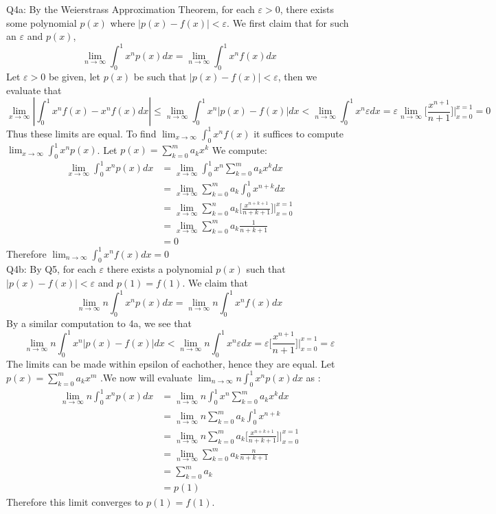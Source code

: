 \documentclass[letterpaper]{article}
\begin{document}
\noindent Q4a: By the Weierstrass Approximation Theorem, for each $\varepsilon>0$, there exists some polynomial $p(x)$ where $|p(x)-f(x)|<\varepsilon$. We first claim that for such an $\varepsilon$ and $p(x)$, $$\lim_{n\to \infty} \int_{0}^1 x^n p(x) dx = \lim_{n \to \infty}\int_0^1 x^n f(x) dx$$
Let $\varepsilon>0$ be given, let $p(x)$ be such that $|p(x)-f(x)|<\varepsilon$, then we evaluate that
$$\lim_{x \to \infty}|\int_{0}^1 x^nf(x) -x^nf(x) dx| \leq \lim_{n\to \infty} \int_0^1 x^n|p(x)-f(x)|dx < \lim_{n\to \infty} \int_0^1 x^n \varepsilon dx = \varepsilon \lim_{n\to \infty}\Big[\frac{x^{n+1}}{n+1}\Big] \Big|_{x=0}^{x=1} =0$$
Thus these limits are equal. To find $\lim_{x \to \infty}\int_{0}^1 x^nf(x)$ it suffices to compute $\lim_{x \to \infty}\int_{0}^1 x^np(x)$. Let $p(x) = \sum_{k=0}^m a_k x^k$
We compute:
\begin{align*}
    \lim_{x \to \infty}\int_{0}^1 x^n p(x) dx & = \lim_{x \to \infty}\int_{0}^1 x^n \sum_{k=0}^m a_k x^k dx
    \\ & = \lim_{x \to \infty}\sum_{k=0}^m a_k \int_{0}^1 x^{n+k} dx
    \\ & = \lim_{x \to \infty} \sum_{k=0}^n a_k \Big[\frac{x^{n+k+1}}{n+k+1} \Big] \Big|_{x=0}^{x=1}
    \\ & = \lim_{x \to \infty} \sum_{k=0}^m a_k \frac{1}{n+k+1}
    \\ & = 0
\end{align*} Therefore $\lim_{n\to \infty } \int_{0}^1 x^n f(x)dx = 0$
\newline \\ Q4b: By Q5, for each $\varepsilon$ there exists a polynomial $p(x)$ such that $|p(x)-f(x)|< \varepsilon$ and $p(1)=f(1)$. We claim that $$\lim_{n \to \infty} n \int_{0}^1 x^n p(x) dx = \lim_{n \to \infty} n \int_{0}^1 x^n f(x) dx $$
By a similar computation to 4a, we see that 
$$\lim_{n \to \infty } n \int_{0}^1 x^n|p(x)-f(x)| dx < \lim_{n \to \infty } n \int_{0}^1 x^n \varepsilon  dx = \varepsilon \Big[\frac{x^{n+1}}{n+1} \Big] \Big|_{x=0}^{x=1} = \varepsilon$$
The limits can be made within epsilon of eachother, hence they are equal. Let $p(x) = \sum_{k=0}^m a_k x^m$ .We now will evaluate $\lim_{n \to \infty } n \int_{0}^1 x^n p(x) dx$ as : 
\begin{align*}
    \lim_{n \to \infty } n \int_{0}^1x^n p(x) dx  & = \lim_{n \to \infty } n \int_{0}^1 x^n \sum_{k=0}^m a_k x^k dx 
    \\ & = \lim_{n \to \infty } n \sum_{k=0}^m a_k \int_{0}^1 x^{n+k}
    \\ & = \lim_{n \to \infty } n \sum_{k=0}^m a_k \Big[\frac{x^{n+k+1}}{n+k+1} \Big] \Big|_{x=0}^{x=1}
    \\ & = \lim_{n \to \infty } \sum_{k=0}^m a_k \frac{n}{n+k+1}
    \\ & = \sum_{k=0}^m a_k
    \\ & = p(1)
\end{align*}
Therefore this limit converges to $p(1)=f(1)$.
\end{document}
